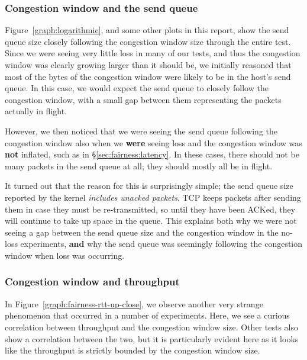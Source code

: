 \subsubsection{Congestion window and the send queue}
\label{sec:closing:sendq}
Figure~\ref{graph:logarithmic}, and some other plots in this report, show the
send queue size closely following the congestion window size through the entire
test. Since we were seeing very little loss in many of our tests, and thus the
congestion window was clearly growing larger than it should be, we initially
reasoned that most of the bytes of the congestion window were likely to be in
the host's send queue. In this case, we would expect the send queue to closely
follow the congestion window, with a small gap between them representing the
packets actually in flight.

However, we then noticed that we were seeing the send queue following the
congestion window also when we \textbf{were} seeing loss and the congestion
window was \textbf{not} inflated, such as in \S\ref{sec:fairness:latency}. In
these cases, there should not be many packets in the send queue at all; they
should mostly all be in flight.

It turned out that the reason for this is surprisingly simple; the send queue
size reported by the kernel \emph{includes unacked packets}. TCP keeps packets
after sending them in case they must be re-transmitted, so until they have been
ACKed, they will continue to take up space in the queue. This explains both why
we were not seeing a gap between the send queue size and the congestion window
in the no-loss experiments, \textbf{and} why the send queue was seemingly
following the congestion window when loss was occurring.

\subsubsection{Congestion window and throughput}

In Figure~\ref{graph:fairness-rtt-up-close}, we observe another very strange
phenomenon that occurred in a number of experiments. Here, we see a curious
correlation between throughput and the congestion window size. Other tests also
show a correlation between the two, but it is particularly evident here as it
looks like the throughput is strictly bounded by the congestion window size.

